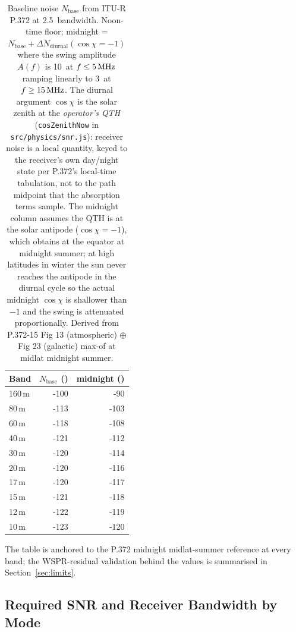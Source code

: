 \documentclass[11pt,a4paper]{article}
\newcommand{\SI}[2]{#1\,\text{#2}}
\newcommand{\si}[1]{\text{#1}}
\newcommand{\dB}{\text{dB}}
\newcommand{\dBm}{\text{dBm}}
\newcommand{\MHz}{\text{MHz}}
\newcommand{\kHz}{\text{kHz}}
\begin{document}
\begin{table}[H]
\centering
\caption{Baseline noise $N_{\text{base}}$ from ITU-R P.372 at
         \SI{2.5}{\kHz} bandwidth.  Noon-time floor; midnight =
         $N_{\text{base}} + \Delta N_{\text{diurnal}}(\cos\chi=-1)$
         where the swing amplitude $A(f)$ is \SI{10}{\dB} at
         $f \le \SI{5}{\MHz}$ ramping linearly to \SI{3}{\dB} at
         $f \ge \SI{15}{\MHz}$.  The diurnal argument $\cos\chi$
         is the solar zenith at the \emph{operator's QTH}
         (\texttt{cosZenithNow} in \texttt{src/physics/snr.js}):
         receiver noise is a local quantity, keyed to the
         receiver's own day/night state per P.372's local-time
         tabulation, not to the path midpoint that the absorption
         terms sample.  The midnight column assumes the
         QTH is at the solar antipode ($\cos\chi = -1$),
         which obtains at the equator at midnight summer; at
         high latitudes in winter the sun never reaches the
         antipode in the diurnal cycle so the actual midnight
         $\cos\chi$ is shallower than $-1$ and the swing is
         attenuated proportionally.  Derived from
         P.372-15 Fig 13 (atmospheric) $\oplus$ Fig 23 (galactic)
         max-of at midlat midnight summer.}
\label{tab:noisebase}
\begin{tabular}{@{}lrr@{}}
\toprule
\textbf{Band} & {$N_{\text{base}}$ (\si{\dBm})} & {midnight (\si{\dBm})} \\
\midrule
160\,m & -100 & -90  \\
80\,m  & -113 & -103 \\
60\,m  & -118 & -108 \\
40\,m  & -121 & -112 \\
30\,m  & -120 & -114 \\
20\,m  & -120 & -116 \\
17\,m  & -120 & -117 \\
15\,m  & -121 & -118 \\
12\,m  & -122 & -119 \\
10\,m  & -123 & -120 \\
\bottomrule
\end{tabular}
\end{table}

The table is anchored to the P.372 midnight midlat-summer
reference at every band; the WSPR-residual
validation behind the values is summarised in
Section~\ref{sec:limits}.

\subsection{Required SNR and Receiver Bandwidth by Mode}\label{sec:modebw}
\end{document}
